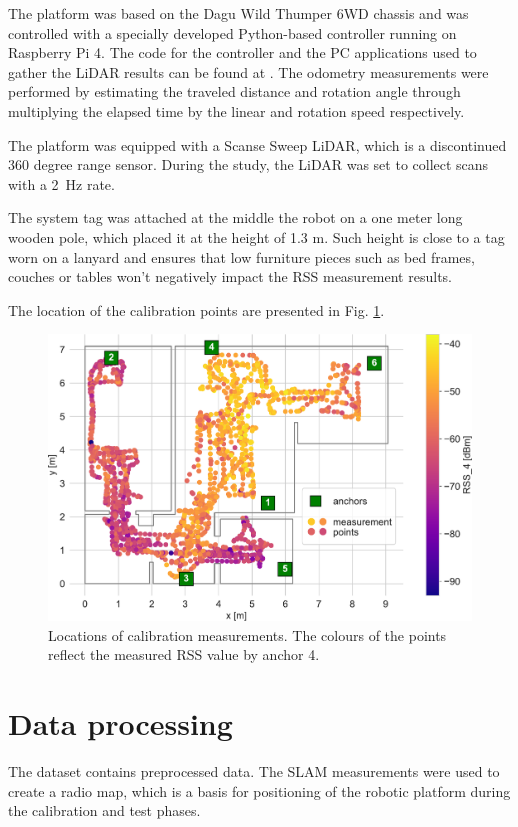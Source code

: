 \documentclass[conference, 11pt, onecolumn]{IEEEtran}
\begin{document}
The platform was based on the Dagu Wild Thumper 6WD chassis and was controlled with a specially developed Python-based controller running on Raspberry Pi 4. The code for the controller and the PC applications used to gather the LiDAR results can be found at \cite{b2}.  The odometry measurements were performed by estimating the traveled distance and rotation angle through multiplying the elapsed time by the linear and rotation speed respectively.

The platform was equipped with a Scanse Sweep LiDAR, which is a discontinued 360 degree range sensor. During the study, the LiDAR was set to collect scans with a 2~Hz rate.

The system tag was attached at the middle the robot on a one meter long wooden pole, which placed it at the height of 1.3 m. Such height is close to a tag worn on a lanyard and ensures that low furniture pieces such as bed frames, couches or tables won't negatively impact the RSS measurement results.

The location of the calibration points are presented in Fig. \ref{fig:calibration}.

\begin{figure}[h]
\centering
\includegraphics[width=.7\columnwidth]{figs/measurement_points}
\caption{\label{fig:calibration}Locations of calibration measurements. The colours of the points reflect the measured RSS value by anchor 4.}
\end{figure}

\section{Data processing}
The dataset contains preprocessed data. The SLAM measurements were used to create a radio map, which is a basis for positioning of the robotic platform during the calibration and test phases.
\end{document}
